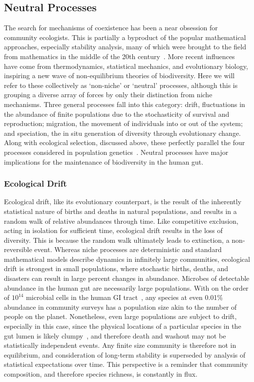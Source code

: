 \documentclass[12pt]{article}
\begin{document}
\subsection{Neutral Processes}
The search for mechanisms of coexistence has been a near obsession for
community ecologists.
This is partially a byproduct of the popular mathematical approaches,
especially stability analysis,
many of which were brought to the field from mathematics
in the middle of the 20th century~\citep[e.g\@.][]{May1973,MacArthurTODO}.
More recent influences have come from thermodynamics,
statistical mechanics, and evolutionary biology,
inspiring a new wave of non-equilibrium theories of biodiversity.
Here we will refer to these collectively as `non-niche' or `neutral'
processes,
although this is grouping a diverse array of forces by only their
distinction from niche mechanisms.
Three general processes fall into this category:
drift, fluctuations in the abundance of finite populations due to
the stochasticity of survival and reproduction;
migration, the movement of individuals into or out of the system;
and speciation, the in situ generation of diversity through
evolutionary change.
Along with ecological selection, discussed above,
these perfectly parallel the four processes considered in population
genetics~\citep{Vellend2010}.
Neutral processes have major implications for the maintenance of
biodiversity in the human gut.

\subsubsection{Ecological Drift}
Ecological drift, like its evolutionary counterpart, is the result
of the inherently statistical nature of births and deaths in
natural populations, and results in a random walk of
relative abundances through time.
Like competitive exclusion, acting in isolation for
sufficient time,
ecological drift results in the loss of diversity.
This is because the random walk ultimately
leads to extinction, a non-reversible event.
Whereas niche processes are deterministic and standard mathematical
models describe dynamics in infinitely large communities,
ecological drift is strongest in small populations, where
stochastic births, deaths, and disasters can result in large
percent changes in abundance.
Microbes of detectable abundance in the human gut are necessarily
large populations.
With on the order of \(10^{14}\) microbial cells in
the human GI tract~\citep{TODO},
any species at even 0.01\% abundance in community surveys
has a population size akin to the number of people on the planet.
Nonetheless, even large populations are subject to drift,
especially in this case,
since the physical locations of a particular species in
the gut lumen is likely clumpy~\citep{TODO}, and therefore death and washout
may not be statistically independent events.
Any finite size community is therefore not in equilibrium,
and consideration of long-term stability is superseded by
analysis of statistical expectations over time.
This perspective is a reminder that community composition,
and therefore species richness, is constantly in flux.
\end{document}
